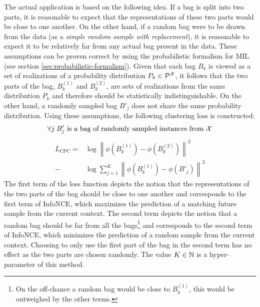 The actual application is based on the following idea. If a bag is split into two parts, it is reasonable to expect that the representations of these two parts would be close to one another. On the other hand, if a random bag were to be drawn from the data (as a \textit{simple random sample with replacement}), it is reasonable to expect it to be relatively far from any actual bag present in the data. These assumptions can be proven correct by using the probabilistic formalism for MIL (see section \ref{sec:probabilistic-formalism}). Given that each bag \( B_k \) is viewed as a set of realizations of a probability distribution \( P_k \in \mathcal{P}^\mathspace{X} \), it follows that the two parts of the bag, \( B_k^{(1)} \) and \( B_k^{(2)} \), are sets of realizations from the same distribution \( P_k \) and therefore should be statistically indistinguishable. On the other hand, a randomly sampled bag \( B'_j \) does not share the same probability distribution.
Using these assumptions, the following clustering loss is constructed:
\[ \forall j \; B'_j \text{ is a bag of randomly sampled instances from } \mathcal{X} \]
\begin{align*}
	L_\mathrm{CPC} = &\log \left\lVert \phi \left( B_k^{(1)} \right) - \phi \left( B_k^{(2)} \right) \right\rVert^2 \\
	- &\log \sum_{j = 1}^K \left\lVert \phi \left( B_k^{(1)} \right) - \phi \left( B'_j \right) \right\rVert^2
\end{align*}
The first term of the loss function depicts the notion that the representations of the two parts of the bag should be close to one another and corresponds to the first term of InfoNCE, which maximizes the prediction of a matching future sample from the current context. The second term depicts the notion that a random bag should be far from all the bags\footnote{On the off-chance a random bag would be close to \( B_k^{(1)} \), this would be outweighed by the other terms.} and corresponds to the second term of InfoNCE, which minimizes the prediction of a random sample from the current context. Choosing to only use the first part of the bag in the second term has no effect as the two parts are chosen randomly. The value \( K \in \mathbb{N} \) is a hyper-parameter of this method.

